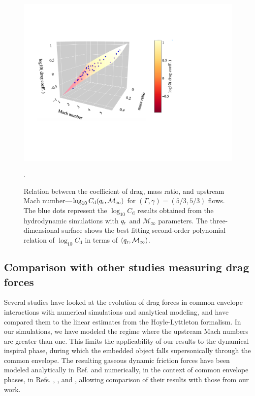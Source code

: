 \begin{figure}
 \centering
 \includegraphics[width=14cm]{figures/common_envelope/logdrag_order2_g53_inc_mdotdrag.pdf}\caption{Relation between the coefficient of drag, mass ratio, and upstream Mach number---$\log_{10}C_{\mathrm d} (q_{\rm r}, \mathcal{M}_\infty)$ for $(\Gamma, \gamma) = (5/3, 5/3)$ flows. The blue dots represent the $\log_{10}C_{\mathrm d}$ results obtained from the hydrodynamic simulations with $q_{\rm r}$ and $\mathcal{M}_\infty$ parameters. The three-dimensional surface shows the best fitting second-order polynomial relation of $\log_{10}C_{\mathrm d}$ in terms of $(q_{\rm r}, \mathcal{M}_\infty)$.\label{fig:logdrag_g53}}.
\end{figure}

\subsection{Comparison with other studies measuring drag forces\label{sec:compare_drag}}
Several studies have looked at the evolution of drag forces in common envelope interactions with numerical simulations and analytical modeling, and have compared them to the linear estimates from the Hoyle-Lyttleton formalism. In our simulations, we have modeled the regime where the upstream Mach numbers are greater than one. This limits the applicability of our results to the dynamical inspiral phase, during which the embedded object falls supersonically through the common envelope. The resulting gaseous dynamic friction forces have been modeled analytically in Ref. \cite{1999ApJ...513..252O} and numerically, in the context of common envelope phases, in Refs. \cite{Staff:2016}, \cite{Reichardt:2019}, and \cite{Chamandy:2019psk}, allowing comparison of their results with those from our work.

